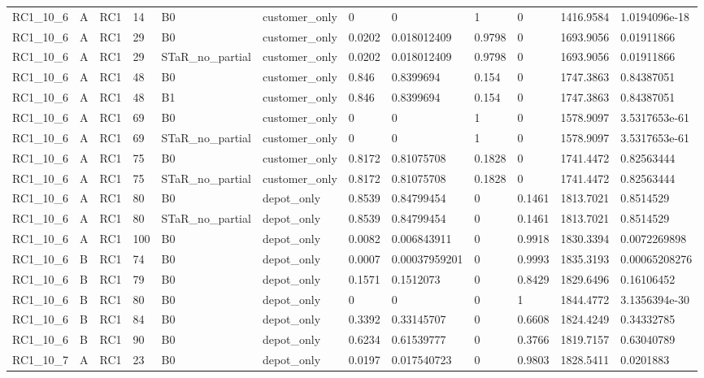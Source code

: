 \begin{longtable}{llllllllllll}
RC1\_10\_6 & A & RC1 & 14 & B0 & customer\_only & 0 & 0 & 1 & 0 & 1416.9584 & 1.0194096e-18 \\
RC1\_10\_6 & A & RC1 & 29 & B0 & customer\_only & 0.0202 & 0.018012409 & 0.9798 & 0 & 1693.9056 & 0.01911866 \\
RC1\_10\_6 & A & RC1 & 29 & STaR\_no\_partial & customer\_only & 0.0202 & 0.018012409 & 0.9798 & 0 & 1693.9056 & 0.01911866 \\
RC1\_10\_6 & A & RC1 & 48 & B0 & customer\_only & 0.846 & 0.8399694 & 0.154 & 0 & 1747.3863 & 0.84387051 \\
RC1\_10\_6 & A & RC1 & 48 & B1 & customer\_only & 0.846 & 0.8399694 & 0.154 & 0 & 1747.3863 & 0.84387051 \\
RC1\_10\_6 & A & RC1 & 69 & B0 & customer\_only & 0 & 0 & 1 & 0 & 1578.9097 & 3.5317653e-61 \\
RC1\_10\_6 & A & RC1 & 69 & STaR\_no\_partial & customer\_only & 0 & 0 & 1 & 0 & 1578.9097 & 3.5317653e-61 \\
RC1\_10\_6 & A & RC1 & 75 & B0 & customer\_only & 0.8172 & 0.81075708 & 0.1828 & 0 & 1741.4472 & 0.82563444 \\
RC1\_10\_6 & A & RC1 & 75 & STaR\_no\_partial & customer\_only & 0.8172 & 0.81075708 & 0.1828 & 0 & 1741.4472 & 0.82563444 \\
RC1\_10\_6 & A & RC1 & 80 & B0 & depot\_only & 0.8539 & 0.84799454 & 0 & 0.1461 & 1813.7021 & 0.8514529 \\
RC1\_10\_6 & A & RC1 & 80 & STaR\_no\_partial & depot\_only & 0.8539 & 0.84799454 & 0 & 0.1461 & 1813.7021 & 0.8514529 \\
RC1\_10\_6 & A & RC1 & 100 & B0 & depot\_only & 0.0082 & 0.006843911 & 0 & 0.9918 & 1830.3394 & 0.0072269898 \\
RC1\_10\_6 & B & RC1 & 74 & B0 & depot\_only & 0.0007 & 0.00037959201 & 0 & 0.9993 & 1835.3193 & 0.00065208276 \\
RC1\_10\_6 & B & RC1 & 79 & B0 & depot\_only & 0.1571 & 0.1512073 & 0 & 0.8429 & 1829.6496 & 0.16106452 \\
RC1\_10\_6 & B & RC1 & 80 & B0 & depot\_only & 0 & 0 & 0 & 1 & 1844.4772 & 3.1356394e-30 \\
RC1\_10\_6 & B & RC1 & 84 & B0 & depot\_only & 0.3392 & 0.33145707 & 0 & 0.6608 & 1824.4249 & 0.34332785 \\
RC1\_10\_6 & B & RC1 & 90 & B0 & depot\_only & 0.6234 & 0.61539777 & 0 & 0.3766 & 1819.7157 & 0.63040789 \\
RC1\_10\_7 & A & RC1 & 23 & B0 & depot\_only & 0.0197 & 0.017540723 & 0 & 0.9803 & 1828.5411 & 0.0201883 \\

\end{longtable}

